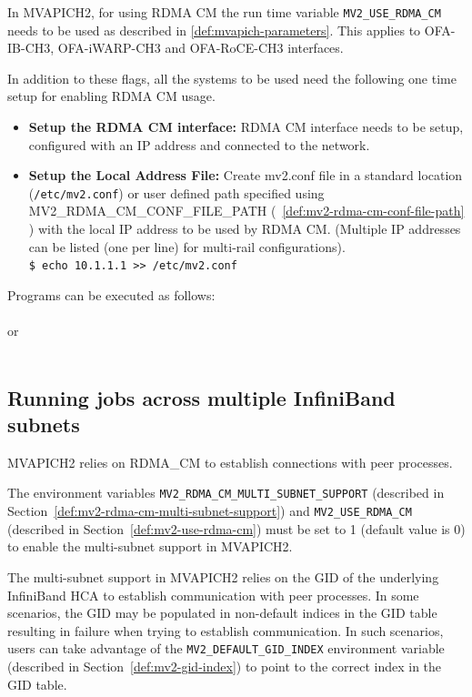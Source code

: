 In MVAPICH2, for using RDMA CM the run time variable
\texttt{MV2\_USE\_RDMA\_CM} needs to be used as described in
\ref{def:mvapich-parameters}. This applies to OFA-IB-CH3,
OFA-iWARP-CH3 and OFA-RoCE-CH3 interfaces.

In addition to these flags, all the systems to be used need the
following one time setup for enabling RDMA CM usage.


\begin{itemize}
		\item {\bf Setup the RDMA CM interface:} RDMA CM interface needs to be
				setup, configured with an IP address and connected to the network.
				\\
		\item {\bf Setup the Local Address File:} Create mv2.conf file in a standard location
				(\texttt{/etc/mv2.conf}) or user defined path specified using MV2\_RDMA\_CM\_CONF\_FILE\_PATH (~\ref{def:mv2-rdma-cm-conf-file-path} ) with the local IP address to be used
				by RDMA CM. (Multiple IP addresses can
                                be listed (one per line) for multi-rail configurations).
				\\
				\texttt{\$ echo 10.1.1.1 >> /etc/mv2.conf}\\
\end{itemize}

Programs can be executed as follows:
\\
\\
or \\
\\

\subsection{Running jobs across multiple InfiniBand subnets}
\label{subsec:mpi-multi-subnet}

MVAPICH2 relies on RDMA\_CM to establish connections with peer processes. 

The environment variables \texttt{MV2\_RDMA\_CM\_MULTI\_SUBNET\_SUPPORT}
(described in Section~\ref{def:mv2-rdma-cm-multi-subnet-support}) and
\texttt{MV2\_USE\_RDMA\_CM}  (described in Section~\ref{def:mv2-use-rdma-cm})
must be set to 1 (default value is 0) to enable the multi-subnet support in
MVAPICH2.

The multi-subnet support in MVAPICH2 relies on the GID of the underlying
InfiniBand HCA to establish communication with peer processes. In some
scenarios, the GID may be populated in non-default indices in the GID table
resulting in failure when trying to establish communication. In such scenarios,
users can take advantage of the \texttt{MV2\_DEFAULT\_GID\_INDEX} environment
variable (described in Section~\ref{def:mv2-gid-index}) to point to the correct
index in the GID table.

